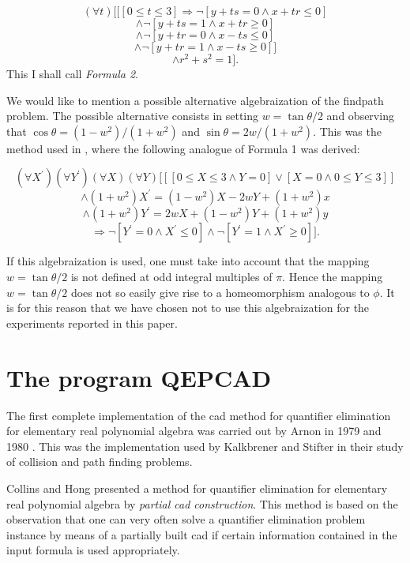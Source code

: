 \[(\forall t)[ [ [0 \le t \le 3] \Rightarrow
               \neg [y + ts = 0 \wedge x + tr \le 0]\]
 \[   \wedge     \neg [y + ts = 1 \wedge x + tr \ge 0]\]
 \[   \wedge     \neg [y + tr = 0 \wedge x - ts \le 0]\]
 \[   \wedge     \neg [y + tr = 1 \wedge x - ts \ge 0] ]\]
 \[   \wedge     r^{2} + s^{2} = 1 ].\]
This I shall call {\em Formula 2}.

We would like to mention a possible alternative algebraization
of the findpath problem. The possible alternative consists in
setting $w = \tan \theta /2$ and observing that
$\cos \theta = (1 - w^{2})/(1 + w^{2})$ and
$\sin \theta = 2w/(1 + w^{2})$.
This was the method used in \cite{Kalkbrener_Stifter:87},
where the following analogue of Formula 1 was derived:

\[(\forall X^{\prime})(\forall Y^{\prime})(\forall X)(\forall Y)
   [[[0 \le X \le 3 \wedge Y = 0] \vee [X = 0 \wedge 0 \le Y \le 3]]\]
 \[    \wedge (1 + w^{2})X^{\prime} = (1 - w^{2})X - 2wY + (1+w^{2})x\]
 \[    \wedge (1 + w^{2})Y^{\prime} = 2wX + (1 - w^{2})Y + (1+w^{2})y\]
 \[    \Rightarrow \neg [Y^{\prime} = 0 \wedge X^{\prime} \le 0]
                 \wedge \neg [Y^{\prime} = 1 \wedge X^{\prime} \ge 0]  ].\]

If this algebraization is used, one must take into account that
the mapping $w = \tan \theta /2$ is not defined at odd integral
multiples of $\pi$. Hence the mapping $w = \tan \theta /2$ does not so easily
give rise to a homeomorphism analogous to $\phi$. It is for this reason
that we have chosen not to use this algebraization for the experiments
reported in this paper.

\section{The program QEPCAD}
The first complete implementation of the cad method 
for quantifier elimination for elementary real polynomial algebra was
carried out by Arnon in 1979 and 1980 \cite{Arnon:81}.
This was the implementation used by Kalkbrener
and Stifter in their study \cite{Kalkbrener_Stifter:87}
of collision and path finding problems.

Collins and Hong \cite{Collins_Hong:91} presented a method for
quantifier elimination for elementary real polynomial algebra
by {\em partial cad construction}. This method is based on the
observation that one can very often solve a quantifier elimination
problem instance by means of a partially built cad if certain information
contained in the input formula is used appropriately.

